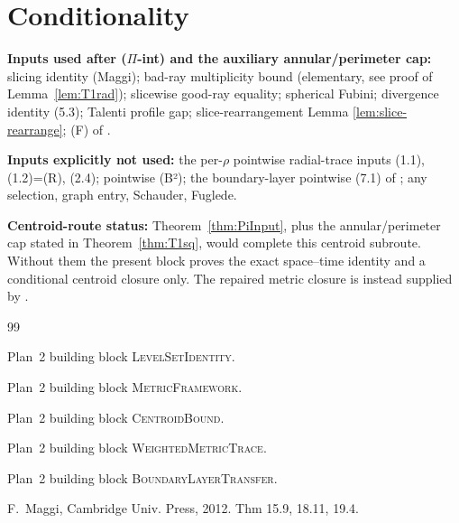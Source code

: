\documentclass[11pt]{article}
\theoremstyle{definition}
\begin{document}
\section{Conditionality}\label{sec:conditionality}

\textbf{Inputs used after \textup{($\Pi$-int)} and the auxiliary annular/perimeter cap:}
slicing identity (Maggi); bad-ray multiplicity bound (elementary, see proof of Lemma~\ref{lem:T1rad}); slicewise good-ray equality; spherical Fubini;
divergence identity (5.3); Talenti profile gap;
slice-rearrangement Lemma \ref{lem:slice-rearrange}; (F) of
\cite{CentroidBound}.

\textbf{Inputs explicitly not used:} the per-$\rho$ pointwise radial-trace inputs (1.1), (1.2)=(R),
(2.4); pointwise (B²); the boundary-layer pointwise (7.1) of
\cite{BoundaryLayerTransfer}; any selection, graph entry,
Schauder, Fuglede.

\textbf{Centroid-route status:} Theorem~\ref{thm:PiInput}, plus the
annular/perimeter cap stated in Theorem~\ref{thm:T1sq}, would complete this
centroid subroute. Without them the present block proves the exact
space--time identity and a conditional centroid closure only. The repaired
metric closure is instead supplied by \cite{WeightedMetricTrace}.

\begin{thebibliography}{99}

Plan~2 building block \textsc{LevelSetIdentity}.

Plan~2 building block \textsc{MetricFramework}.

Plan~2 building block \textsc{CentroidBound}.

Plan~2 building block \textsc{WeightedMetricTrace}.

Plan~2 building block \textsc{BoundaryLayerTransfer}.

F.~Maggi, Cambridge Univ. Press, 2012. Thm 15.9, 18.11, 19.4.

\end{thebibliography}
\end{document}
